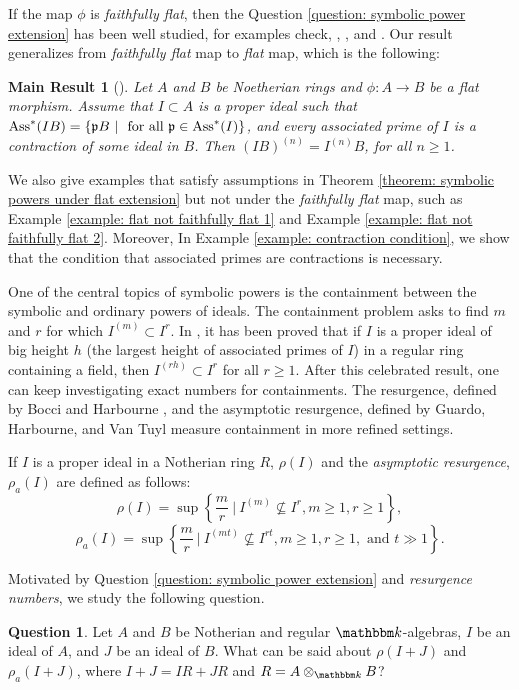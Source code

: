\documentclass[12pt]{amsart}
\numberwithin{equation}{section}
\newtheorem{introthm*}{Main Result}
\theoremstyle{definition}
\newtheorem{question}[theorem]{Question}
\DeclareMathOperator{\Ass}{Ass}
\newcommand{\kk}{{\mathbbm k}}
\def\pp{{\frak p}}
\begin{document}
If the map $\phi$ is \emph{faithfully flat}, then the Question \ref{question: symbolic power extension} has been well studied, for examples check, \cite[Theorem 3.6]{GHMNmatroid}, \cite[Theorem 4]{Akessesh}, and \cite[Proposition 2.1]{walker2018uniform}. Our result generalizes from \emph{faithfully flat} map to \emph{flat} map, which is the following:

\begin{introthm*} []
	Let $A$ and $B$ be Noetherian rings  and $\phi: A\to B$ be a flat morphism. Assume that $I\subset A$ is a proper ideal such that $\Ass^*(IB)=\{\pp B~|~ \text{ for all } \pp\in \Ass^*(I) \}$, and every associated prime of $I$ is a contraction of some ideal in $B$. Then $(IB)^{(n)} = I^{(n)}B $, for all $n \geqslant 1$. 
\end{introthm*}  
 We also give examples that satisfy assumptions in Theorem \ref{theorem: symbolic powers under flat extension} but not under the \emph{faithfully flat} map, such as Example \ref{example: flat not faithfully flat 1} and Example \ref{example: flat not faithfully flat 2}. Moreover, In Example \ref{example: contraction condition}, we show that the condition that associated primes are contractions is necessary.

One of the central topics of symbolic powers is the containment between the symbolic and ordinary powers of ideals.  The containment problem asks to find $m$ and $r$ for which $I^{(m)} \subset I^r$. In \cite{EinLazarsfeldSmith, HochsterHuneke, MaScwede}, it has been proved that if $I$ is a proper ideal of big height $h$ (the largest height of associated primes of $I$) in a regular ring containing a field, then $I^{(rh)}\subset I^r$ for all $r \geqslant 1$. After this celebrated result, one can keep investigating exact numbers for containments. The resurgence, defined by Bocci and Harbourne \cite{bocci2010comparing}, and the asymptotic resurgence, defined by Guardo, Harbourne, and Van Tuyl \cite{guardo2013asymptotic} measure containment in more refined settings.  

If $I$ is a proper ideal in a Notherian ring $R$, $\rho(I)$ and the \emph{asymptotic resurgence}, $\rho_a(I)$ are defined as follows: 
$$
\rho(I) =  \sup \left\{ \dfrac{m}{r} ~|~ I^{(m)} \not\subseteq I^r, m\geqslant 1, r\geqslant 1 \right\}, $$ $$ {\rho_a}(I) = \sup \left\{ \frac{m}{r} ~|~ I^{(mt)} \not\subseteq {I^{rt}}, m\geqslant 1, r\geqslant 1, \text{ and } t \gg 1 \right\}. 
$$

Motivated by Question \ref{question: symbolic power extension} and \emph{resurgence numbers},  we study the following question. 
\begin{question}\label{question: resurgence extension}
	Let $A$ and $B$ be Notherian and regular $\kk$-algebras,  $I$ be an ideal of $A$, and $J$ be an ideal of $B$. What can be said about $\rho(I+J)$ and $\rho_a(I+J)$, where $I+J=IR+JR$ and $R=A \otimes_{\kk} B$?   
\end{question}
\end{document}
